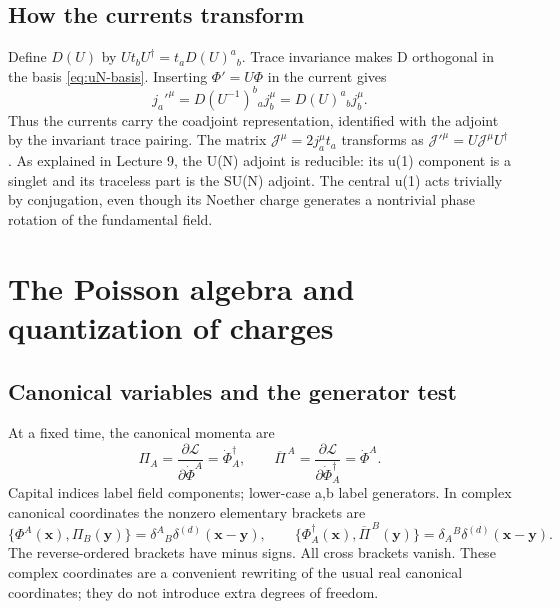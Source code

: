 \documentclass[11pt]{article}
\newcommand{\Lag}{\mathcal{L}}
\begin{document}
\subsection{How the currents transform}
Define \(D(U)\) by \(Ut_bU^\dagger=t_aD(U)^a{}_b\).
Trace invariance makes D orthogonal in the basis
\eqref{eq:uN-basis}. Inserting \(\Phi'=U\Phi\) in the current gives
\begin{equation}
 j_a'^\mu=D(U^{-1})^b{}_a j_b^\mu
          =D(U)^a{}_b j_b^\mu.
 \label{eq:current-adjoint}
\end{equation}
Thus the currents carry the coadjoint representation, identified with
the adjoint by the invariant trace pairing. The matrix
\(\mathcal J^\mu=2j_a^\mu t_a\) transforms as
\(\mathcal J'^\mu=U\mathcal J^\mu U^\dagger\).
As explained in Lecture 9, the U(N) adjoint is reducible: its u(1)
component is a singlet and its traceless part is the SU(N) adjoint.
The central u(1) acts trivially by conjugation, even though its Noether
charge generates a nontrivial phase rotation of the fundamental field.

\section{The Poisson algebra and quantization of charges}
\label{sec:charges}
\subsection{Canonical variables and the generator test}
At a fixed time, the canonical momenta are
\begin{equation}
 \Pi_A=\frac{\partial\Lag}{\partial\dot\Phi^A}
       =\dot\Phi_A^\dagger,
 \qquad
 \overline\Pi^{\,A}=\frac{\partial\Lag}{\partial\dot\Phi_A^\dagger}
       =\dot\Phi^A.
 \label{eq:momenta}
\end{equation}
Capital indices label field components; lower-case a,b label generators.
In complex canonical coordinates the nonzero elementary brackets are
\begin{equation}
 \{\Phi^A(\bm x),\Pi_B(\bm y)\}
 =\delta^A{}_B\delta^{(d)}(\bm x-\bm y),\qquad
 \{\Phi_A^\dagger(\bm x),\overline\Pi^{\,B}(\bm y)\}
 =\delta_A{}^B\delta^{(d)}(\bm x-\bm y).
 \label{eq:canonical-pb}
\end{equation}
The reverse-ordered brackets have minus signs. All cross brackets vanish.
These complex coordinates are a convenient rewriting of the usual real
canonical coordinates; they do not introduce extra degrees of freedom.
\end{document}
